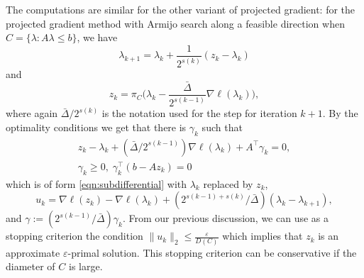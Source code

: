 \documentclass[article]{jss}
\begin{document}
{The computations are similar for the
other variant of projected gradient:
for the projected gradient method with Armijo search along a feasible direction when
$C=\{\lambda: A \lambda \leq b\}$, we have
$$ \lambda_{k+1}=\lambda_{k} + \frac{1}{2^{s(k)}}(z_{k} - \lambda_{k})
$$
and 
$$
z_{k}=\pi_{C}\Big(\lambda_{k}-\frac{\bar \Delta}{2^{s(k-1)}}\nabla \ell(\lambda_{k})\Big),
$$
where again ${\bar \Delta}/2^{s(k)}$
is the notation used for
the step for iteration $k+1$.
By the optimality conditions we get
that there is $\gamma_{k}$ such that
$$
\begin{array}{l}
\displaystyle 
z_{k} - \lambda_{k} + ({\bar \Delta}/2^{s(k-1)})
\nabla \ell(\lambda_{k}) + A^{\top} \gamma_{k} = 0,\\
\displaystyle \gamma_{k} \geq 0,\;
\gamma_{k}^{\top}(b-A z_{k})=0
\end{array}
$$
which 
is of form
\eqref{eqn:subdifferential}
with $\lambda_{k}$ replaced by
$z_{k}$,
$$
u_{k}=\nabla \ell(z_{k})-\nabla \ell(\lambda_{k})
+(2^{s(k-1)+s(k)}/{\bar \Delta})(\lambda_{k}-\lambda_{k+1}),
$$
and $\gamma:=(2^{s(k-1)}/{\bar \Delta}) \gamma_{k}$. From our previous discussion,
we can use as a stopping criterion
the condition
$\|u_{k}\|_{2} \leq \frac{\varepsilon}{D(C)}$
which implies that
$z_{k}$ is an approximate
$\varepsilon$-primal solution. This stopping criterion can be conservative if the diameter of $C$ is large.

}\fi
\end{document}
